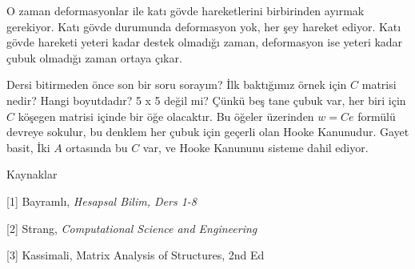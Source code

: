 \documentclass[12pt,fleqn]{article}\usepackage{../../common}
\begin{document}
O zaman deformasyonlar ile katı gövde hareketlerini birbirinden ayırmak
gerekiyor. Katı gövde durumunda deformasyon yok, her şey hareket ediyor.
Katı gövde hareketi yeteri kadar destek olmadığı zaman, deformasyon ise
yeteri kadar çubuk olmadığı zaman ortaya çıkar.

Dersi bitirmeden önce son bir soru sorayım? İlk baktığımız örnek için $C$
matrisi nedir? Hangi boyutdadır? 5 x 5 değil mi? Çünkü beş tane çubuk var, her
biri için $C$ köşegen matrisi içinde bir öğe olacaktır.  Bu öğeler üzerinden $w
= C e$ formülü devreye sokulur, bu denklem her çubuk için geçerli olan Hooke
Kanunudur. Gayet basit, İki $A$ ortasında bu $C$ var, ve Hooke Kanununu sisteme
dahil ediyor.

Kaynaklar

[1] Bayramlı, {\em Hesapsal Bilim, Ders 1-8}

[2] Strang, {\em Computational Science and Engineering}

[3] Kassimali, Matrix Analysis of Structures, 2nd Ed
\end{document}
